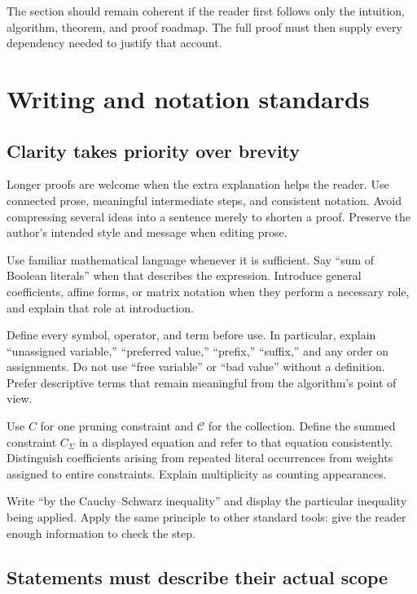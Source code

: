 \documentclass[11pt,a4paper]{article}
\begin{document}
The section should remain coherent if the reader first follows only the
intuition, algorithm, theorem, and proof roadmap. The full proof must
then supply every dependency needed to justify that account.

\section{Writing and notation standards}

\subsection{Clarity takes priority over brevity}

Longer proofs are welcome when the extra explanation helps the reader.
Use connected prose, meaningful intermediate steps, and consistent
notation. Avoid compressing several ideas into a sentence merely to
shorten a proof. Preserve the author's intended style and message when
editing prose.

Use familiar mathematical language whenever it is sufficient. Say
``sum of Boolean literals'' when that describes the expression. Introduce
general coefficients, affine forms, or matrix notation when they perform
a necessary role, and explain that role at introduction.

Define every symbol, operator, and term before use. In particular, explain
``unassigned variable,'' ``preferred value,'' ``prefix,'' ``suffix,'' and
any order on assignments. Do not use ``free variable'' or ``bad value''
without a definition. Prefer descriptive terms that remain meaningful
from the algorithm's point of view.

Use $C$ for one pruning constraint and $\mathcal C$ for the collection.
Define the summed constraint $C_\Sigma$ in a displayed equation and
refer to that equation consistently. Distinguish coefficients arising
from repeated literal occurrences from weights assigned to entire
constraints. Explain multiplicity as counting appearances.

Write ``by the Cauchy--Schwarz inequality'' and display the particular
inequality being applied. Apply the same principle to other standard
tools: give the reader enough information to check the step.

\subsection{Statements must describe their actual scope}
\end{document}
